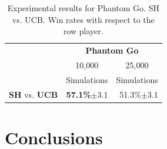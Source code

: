 \documentclass[a4paper]{llncs}
\begin{document}
\begin{table}[ht]
\centering
\setlength{\tabcolsep}{10pt}
\begin{tabular}{@{}lrr@{}}
\toprule
& \multicolumn{2}{c}{\textbf{Phantom Go}} \\
& \multicolumn{1}{c}{10,000} & \multicolumn{1}{c}{25,000} \\
& \multicolumn{1}{c}{Simulations} & \multicolumn{1}{c}{Simulations} \\ [1mm] \cmidrule(l){1-3}
\textbf{SH} vs. \textbf{UCB} &	\textbf{57.1\%}$\pm$3.1	& 51.3\%$\pm$3.1	\\ [.5mm]
\bottomrule
\end{tabular}
\vspace{2mm}
{\caption{Experimental results for Phantom Go. SH vs. UCB. Win rates with respect to the row player.} \label{tab:ph_go}}
\end{table}

\section{Conclusions}
\label{sec:concl}



\end{document}

